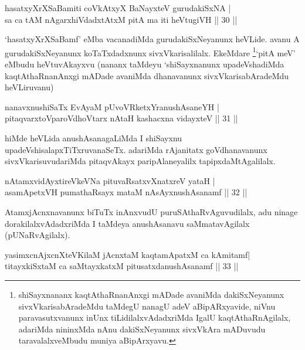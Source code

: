 
\begin{shl}
hasatxyXrXSaBamiti coVkAtxyX BaNayxteV gurudakiSxNA |\\
sa ca tAM nAgarxhiVdadxtAtxM pitA ma iti heVtugiVH \hfill || 30 || 
\end{shl}

\begin{artha}
`hasatxyXrXSaBamf' eMba vacanadiMda gurudakiSxNeyanunx heVLide. avanu A gurudakiSxNeyanunx koTaTxdadxnunx sivxVkarisalilalx. EkeMdare \footnote{shiSayxnananx kaqtAthaRnanAnxgi mADade avaniMda dakiSxNeyanunx sivxVkarisabAradeMdu taMdegU nanagU adeV aBipARxyavide, niVnu paravasutxvanunx inUnx tiLidilalxvAdadxriMda IgalU kaqtAthaRnAgilalx, adariMda nininxMda nAnu dakiSxNeyanunx sivxVkAra mADuvudu taravalalxveMbudu muniya aBipArxyavu.}`pitA meV' eMbudu heVtuvAkayxvu (nananx taMdeyu `shiSayxnanunx upadeVshadiMda kaqtAthaRnanAnxgi mADade avaniMda dhanavanunx sivxVkarisabAradeMdu heVLiruvanu)
\end{artha}


\begin{shl}
nanavxnushiSaTx EvAyaM pUvoVRketxYranushAsaneYH |\\
pitaqvarxtoVparoVdhoV\s tarx nAtaH kashacxna vidayxteV \hfill || 31 || 
\end{shl}

\begin{artha}
hiMde heVLida anushAsanagaLiMda I shiSayxnu upadeVshisalapxTiTxruvanaSeTx. adariMda rAjanitatx goVdhanavanunx sivxVkarisuvudariMda pitaqvAkayx paripAlaneyalilx tapipxdaMtAgalilalx.
\end{artha}

\begin{shl}
nA\s \s tamxvidAyxtireVkeVNa pituvaRsatxvXnatxreV yataH |\\
asamApetxVH pumathaRsayx mataM nAsAyxnushAsanamf \hfill || 32 || 
\end{shl}

\begin{artha}
AtamxjAcnxnavanunx biTuTx inAnxvudU puruSAthaRvAguvudilalx, adu ninage dorakilalxvAdadxriMda I taMdeya anushAsanavu saMmatavAgilalx (pUNaRvAgilalx).
\end{artha}


\begin{shl}
yasimxcnAjxcnXteV\s KilaM jAcnxtaM kaqtamApatxM ca kAmitamf|\\
titayxkiSxtaM ca saMtayxkatxM pitusatxdanushAsanamf \hfill || 33 || 
\end{shl}

